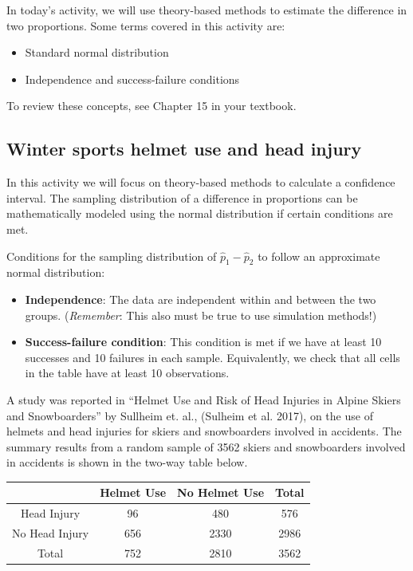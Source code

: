 \documentclass[
]{report}
\begin{document}
In today's activity, we will use theory-based methods to estimate the difference in two proportions. Some terms covered in this activity are:

\begin{itemize}
\item
  Standard normal distribution
\item
  Independence and success-failure conditions
\end{itemize}

To review these concepts, see Chapter 15 in your textbook.

\subsection{Winter sports helmet use and head injury}\label{winter-sports-helmet-use-and-head-injury}

In this activity we will focus on theory-based methods to calculate a confidence interval. The sampling distribution of a difference in proportions can be mathematically modeled using the normal distribution if certain conditions are met.

Conditions for the sampling distribution of \(\hat{p}_1-\hat{p}_2\) to follow an approximate normal distribution:

\begin{itemize}
\item
  \textbf{Independence}: The data are independent within and between the two groups. (\emph{Remember}: This also must be true to use simulation methods!)
\item
  \textbf{Success-failure condition}: This condition is met if we have at least 10 successes and 10 failures in each sample. Equivalently, we check that all cells in the table have at least 10 observations.
\end{itemize}

A study was reported in ``Helmet Use and Risk of Head Injuries in Alpine Skiers and Snowboarders'' by Sullheim et. al., (Sulheim et al. 2017), on the use of helmets and head injuries for skiers and snowboarders involved in accidents. The summary results from a random sample of 3562 skiers and snowboarders involved in accidents is shown in the two-way table below.

\begin{longtable}[]{@{}cccc@{}}
\toprule\noalign{}
& Helmet Use & No Helmet Use & Total \\
\midrule\noalign{}
\endhead
\bottomrule\noalign{}
\endlastfoot
Head Injury & 96 & 480 & 576 \\
No Head Injury & 656 & 2330 & 2986 \\
Total & 752 & 2810 & 3562 \\
\end{longtable}
\end{document}
